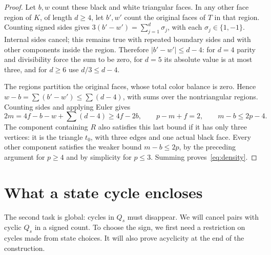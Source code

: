 \documentclass[10pt,a4paper]{amsart}
\theoremstyle{remark}
\begin{document}
\begin{proof}
Let $b,w$ count these black and white triangular faces. In any other face region of $K$, of length $d\geq4$, let $b',w'$ count the original faces of $T$ in that region. Counting signed sides gives $3(b'-w')=\sum_{j=1}^d\sigma_j$, with each $\sigma_j\in\{1,-1\}$. Internal sides cancel; this remains true with repeated boundary sides and with other components inside the region. Therefore $|b'-w'|\leq d-4$: for $d=4$ parity and divisibility force the sum to be zero, for $d=5$ its absolute value is at most three, and for $d\geq6$ use $d/3\leq d-4$.

The regions partition the original faces, whose total color balance is zero. Hence $w-b=\sum(b'-w')\leq\sum(d-4)$, with sums over the nontriangular regions. Counting sides and applying Euler gives
\[
 2m=4f-b-w+\sum(d-4)\geq4f-2b,
 \qquad p-m+f=2,
 \qquad m-b\leq2p-4.
\]
The component containing $R$ also satisfies this last bound if it has only three vertices: it is the triangle $t_0$, with three edges and one actual black face. Every other component satisfies the weaker bound $m-b\leq2p$, by the preceding argument for $p\geq4$ and by simplicity for $p\leq3$. Summing proves~\eqref{eq:density}.
\end{proof}
\section{What a state cycle encloses}\label{sec:disk}
The second task is global: cycles in $Q_s$ must disappear. We will cancel pairs with cyclic $Q_s$ in a signed count. To choose the sign, we first need a restriction on cycles made from state choices. It will also prove acyclicity at the end of the construction.
\end{document}
